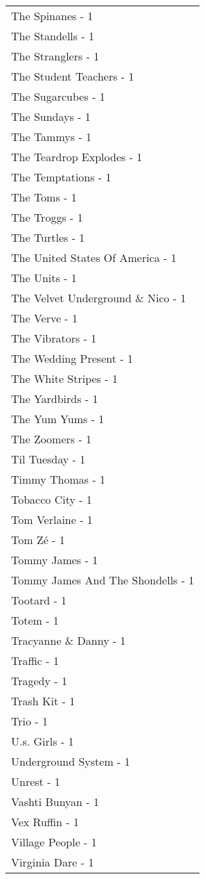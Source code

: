 \documentclass[
]{article}
\begin{document}
\begin{longtable}{l}
The Spinanes - 1 \\ 
The Standells - 1 \\ 
The Stranglers - 1 \\ 
The Student Teachers - 1 \\ 
The Sugarcubes - 1 \\ 
The Sundays - 1 \\ 
The Tammys - 1 \\ 
The Teardrop Explodes - 1 \\ 
The Temptations - 1 \\ 
The Toms - 1 \\ 
The Troggs - 1 \\ 
The Turtles - 1 \\ 
The United States Of America - 1 \\ 
The Units - 1 \\ 
The Velvet Underground \& Nico - 1 \\ 
The Verve - 1 \\ 
The Vibrators - 1 \\ 
The Wedding Present - 1 \\ 
The White Stripes - 1 \\ 
The Yardbirds - 1 \\ 
The Yum Yums - 1 \\ 
The Zoomers - 1 \\ 
Til Tuesday - 1 \\ 
Timmy Thomas - 1 \\ 
Tobacco City - 1 \\ 
Tom Verlaine - 1 \\ 
Tom Zé - 1 \\ 
Tommy James - 1 \\ 
Tommy James And The Shondells - 1 \\ 
Tootard - 1 \\ 
Totem - 1 \\ 
Tracyanne \& Danny - 1 \\ 
Traffic - 1 \\ 
Tragedy - 1 \\ 
Trash Kit - 1 \\ 
Trio - 1 \\ 
U.s. Girls - 1 \\ 
Underground System - 1 \\ 
Unrest - 1 \\ 
Vashti Bunyan - 1 \\ 
Vex Ruffin - 1 \\ 
Village People - 1 \\ 
Virginia Dare - 1 \\ 

\end{longtable}
\end{document}
